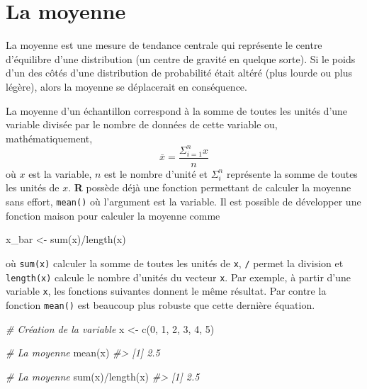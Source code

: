 \documentclass[
]{book}
\newenvironment{Shaded}{}{}
\newcommand{\CommentTok}[1]{\textit{#1}}
\newcommand{\DecValTok}[1]{#1}
\newcommand{\FunctionTok}[1]{#1}
\newcommand{\NormalTok}[1]{#1}
\newcommand{\OtherTok}[1]{#1}
\newcommand{\SpecialCharTok}[1]{#1}
\begin{document}
\hypertarget{la-moyenne}{%
\section{La moyenne}\label{la-moyenne}}

La moyenne est une mesure de tendance centrale qui représente le centre d'équilibre d'une distribution (un centre de gravité en quelque sorte). Si le poids d'un des côtés d'une distribution de probabilité était altéré (plus lourde ou plus légère), alors la moyenne se déplacerait en conséquence.

La moyenne d'un échantillon correspond à la somme de toutes les unités d'une variable divisée par le nombre de données de cette variable ou, mathématiquement, \[\bar{x}=\frac{\Sigma_{i=1}^n x}{n} \] où \(x\) est la variable, \(n\) est le nombre d'unité et \(\Sigma_i^n\) représente la somme de toutes les unités de \(x\). \textbf{R} possède déjà une fonction permettant de calculer la moyenne sans effort, \texttt{mean()} où l'argument est la variable. Il est possible de développer une fonction maison pour calculer la moyenne comme

\begin{Shaded}
\begin{Highlighting}[]
\NormalTok{x\_bar }\OtherTok{\textless{}{-}} \FunctionTok{sum}\NormalTok{(x)}\SpecialCharTok{/}\FunctionTok{length}\NormalTok{(x)}
\end{Highlighting}
\end{Shaded}

où \texttt{sum(x)} calculer la somme de toutes les unités de \texttt{x}, \texttt{/} permet la division et \texttt{length(x)} calcule le nombre d'unités du vecteur \texttt{x}. Par exemple, à partir d'une variable \texttt{x}, les fonctions suivantes donnent le même résultat. Par contre la fonction \texttt{mean()} est beaucoup plus robuste que cette dernière équation.

\begin{Shaded}
\begin{Highlighting}[]
\CommentTok{\# Création de la variable}
\NormalTok{x }\OtherTok{\textless{}{-}} \FunctionTok{c}\NormalTok{(}\DecValTok{0}\NormalTok{, }\DecValTok{1}\NormalTok{, }\DecValTok{2}\NormalTok{, }\DecValTok{3}\NormalTok{, }\DecValTok{4}\NormalTok{, }\DecValTok{5}\NormalTok{)}

\CommentTok{\# La moyenne}
\FunctionTok{mean}\NormalTok{(x)}
\CommentTok{\#\textgreater{} [1] 2.5}

\CommentTok{\# La moyenne}
\FunctionTok{sum}\NormalTok{(x)}\SpecialCharTok{/}\FunctionTok{length}\NormalTok{(x)}
\CommentTok{\#\textgreater{} [1] 2.5}
\end{Highlighting}
\end{Shaded}
\end{document}
